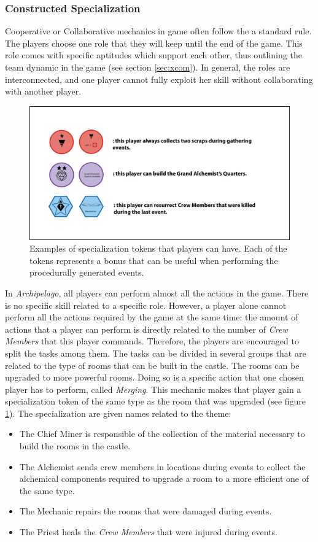 \subsubsection{Constructed Specialization}
Cooperative or Collaborative mechanics in game often follow the a standard rule. The players choose one role that they will keep until the end of the game. This role comes with specific aptitudes which support each other, thus outlining the team dynamic in the game (see section \ref{sec:xcom}). In general, the roles are interconnected, and one player cannot fully exploit her skill without collaborating with another player.
\begin{figure}[h]
    \centering
    \includegraphics[width=\textwidth]{Images/Specialization.png}
    \caption{Examples of specialization tokens that players can have. Each of the tokens represents a bonus that can be useful when performing the procedurally generated events.}
    \label{fig:spec}
\end{figure}
In \textit{Archipelago}, all players can perform almost all the actions in the game. There is no specific skill related to a specific role. However, a player alone cannot perform all the actions required by the game at the same time: the amount of actions that a player can perform is directly related to the number of \textit{Crew Members} that this player commands. Therefore, the players are encouraged to split the tasks among them. The tasks can be divided in several groups that are related to the type of rooms that can be built in the castle. The rooms can be upgraded to more powerful rooms. Doing so is a specific action that one chosen player has to perform, called \textit{Merging}. This mechanic makes that player gain a specialization token of the same type as the room that was upgraded (see figure \ref{fig:spec}). The specialization are given names related to the theme:
\begin{itemize}
\item The Chief Miner is responsible of the collection of the material necessary to build the rooms in the castle. 
\item The Alchemist sends crew members in locations during events to collect the alchemical components required to upgrade a room to a more efficient one of the same type.
\item The Mechanic repairs the rooms that were damaged during events.
\item The Priest heals the \textit{Crew Members} that were injured during events.
\end{itemize}

